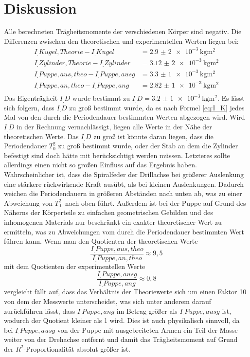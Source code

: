 \section{Diskussion}
\label{sec:Diskussion}
Alle berechneten Trägheitsmomente der verschiedenen Körper sind negativ.
Die Differenzen zwischen den theoretischen und experimentellen Werten liegen bei:
\begin{align*}
I_.{Kugel,Theorie}-I_.{Kugel}		&=\SI{2,9(2)e-3}{\kilo\gram\metre\squared}\\
I_.{Zylinder,Theorie}-I_.{Zylinder}	&=\SI{3,12(2)e-3}{\kilo\gram\metre\squared}\\
I_.{Puppe,aus,theo}-I_.{Puppe,ausg}	&=\SI{3,3(1)e-3}{\kilo\gram\metre\squared}\\
I_.{Puppe,an,theo}-I_.{Puppe,ang}	&=\SI{2,82(1)e-3}{\kilo\gram\metre\squared}\\
\end{align*}
Das Eigenträgheit $I_.D$ wurde bestimmt zu $I_.D=\SI{3,2(1)e-3}{\kilo\gram\metre\squared}$.
Es lässt sich folgern, dass $I_.D$ zu groß bestimmt wurde, da es nach Formel \eqref{eq:I_K} jedes Mal von den durch die Periodendauer bestimmten Werten abgezogen wird. Wird $I_.D$ in der Rechnung vernachlässigt, liegen alle Werte in der Nähe der theoretischen Werte.\newline
Das $I_.D$ zu groß ist könnte daran liegen, dass die Periodendauer $T_0^2$ zu groß bestimmt wurde, oder der Stab an dem die Zylinder befestigt sind doch hätte mit berücksichtigt werden müssen. Letzteres sollte allerdings einen nicht so großen Einfluss auf das Ergebnis haben. Wahrscheinlicher ist, dass die Spiralfeder der Drillachse bei größerer Auslenkung eine stärkere rückwirkende Kraft ausübt, als bei kleinen Auslenkungen. Dadurch weichen die Periodendauern in größeren Abständen nach unten ab, was zu einer Abweichung von $T_.0^2$ nach oben führt.\newline
Außerdem ist bei der Puppe auf Grund des Näherns der Körperteile zu einfachen geometrischen Gebilden und des inhomogenen Materials nur beschränkt ein exakter theoretischer Wert zu ermitteln, was zu Abweichungen vom durch die Periodendauer bestimmten Wert führen kann.
Wenn man den Quotienten der theoretischen Werte \[\frac{I_.{Puppe,aus,theo}}{I_.{Puppe,an,theo}}\approx 9,5\]
mit dem Quotienten der experimentellen Werte \[\frac{I_.{Puppe,ausg}}{I_.{Puppe,ang}}\approx 0,8\]
vergleicht fällt auf, dass das Verhältnis der Theoriewerte sich um einen Faktor 10 von dem der Messwerte unterscheidet, was sich unter anderem darauf zurückführen lässt, dass $I_.{Puppe,ang}$ im Betrag größer als $I_.{Puppe,ausg}$ ist, wodurch der Quotient kleiner als 1 wird. Dies ist auch physikalisch sinnvoll, da bei $I_.{Puppe,ausg}$ von der Puppe mit ausgebreiteten Armen ein Teil der Masse weiter von der Drehachse entfernt und damit das Trägheitsmoment auf Grund der $R^2$-Proportionalität absolut größer ist.
